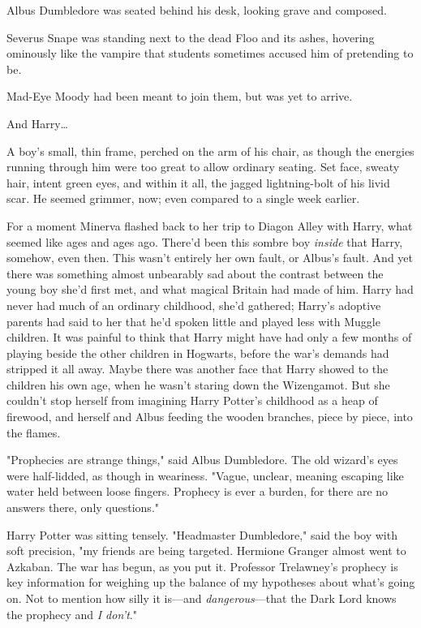 Albus Dumbledore was seated behind his desk, looking grave and composed.

Severus Snape was standing next to the dead Floo and its ashes, hovering
ominously like the vampire that students sometimes accused him of pretending to
be.

Mad-Eye Moody had been meant to join them, but was yet to arrive.

And Harry{\ldots}

A boy's small, thin frame, perched on the arm of his chair, as though the
energies running through him were too great to allow ordinary seating. Set
face, sweaty hair, intent green eyes, and within it all, the jagged
lightning-bolt of his livid scar. He seemed grimmer, now; even compared
to a single week earlier.

For a moment Minerva flashed back to her trip to Diagon Alley with Harry, what
seemed like ages and ages ago. There'd been this sombre boy \emph{inside} that
Harry, somehow, even then. This wasn't entirely her own fault, or Albus's
fault. And yet there was something almost unbearably sad about the contrast
between the young boy she'd first met, and what magical Britain had made of
him. Harry had never had much of an ordinary childhood, she'd gathered; Harry's
adoptive parents had said to her that he'd spoken little and played less with
Muggle children. It was painful to think that Harry might have had only a few
months of playing beside the other children in Hogwarts, before the war's
demands had stripped it all away. Maybe there was another face that Harry
showed to the children his own age, when he wasn't staring down the Wizengamot.
But she couldn't stop herself from imagining Harry Potter's childhood as a heap
of firewood, and herself and Albus feeding the wooden branches, piece by piece,
into the flames.

"Prophecies are strange things," said Albus Dumbledore. The old wizard's eyes
were half-lidded, as though in weariness. "Vague, unclear, meaning escaping
like water held between loose fingers. Prophecy is ever a burden, for there are
no answers there, only questions."

Harry Potter was sitting tensely. "Headmaster Dumbledore," said the boy with
soft precision, "my friends are being targeted. Hermione Granger almost went to
Azkaban. The war has begun, as you put it. Professor Trelawney's prophecy is
key information for weighing up the balance of my hypotheses about what's going
on. Not to mention how silly it is---and \emph{dangerous}---that the Dark Lord
knows the prophecy and \emph{I don't}."

